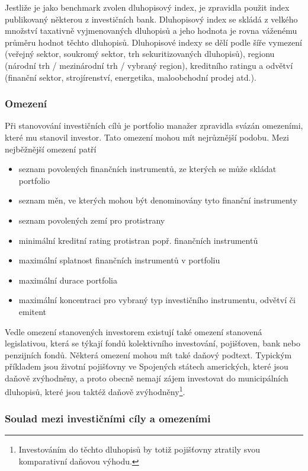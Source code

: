 \documentclass[a4paper]{book}
\begin{document}
Jestliže je jako benchmark zvolen dluhopisový index, je zpravidla použit index publikovaný některou z investičních bank. Dluhopisový index se skládá z velkého množství taxativně vyjmenovaných dluhopisů a jeho hodnota je rovna váženému průměru hodnot těchto dluhopisů. Dluhopisové indexy se dělí podle šíře vymezení (veřejný sektor, soukromý sektor, trh sekuritizovaných dluhopisů), regionu (národní trh / mezinárodní trh / vybraný region), kreditního ratingu a odvětví (finanční sektor, strojírenství, energetika, maloobchodní prodej atd.).

\subsubsection{Omezení}

Při stanovování investičních cílů je portfolio manažer zpravidla svázán omezeními, které mu stanovil investor. Tato omezení mohou mít nejrůznější podobu. Mezi nejběžnější omezení patří
\begin{itemize}
\item seznam povolených finančních instrumentů, ze kterých se může skládat portfolio
\item seznam měn, ve kterých mohou být denominovány tyto finanční instrumenty
\item seznam povolených zemí pro protistrany
\item minimální kreditní rating protistran popř. finančních instrumentů
\item maximální splatnost finančních instrumentů v portfoliu
\item maximální durace portfolia
\item maximální koncentraci pro vybraný typ investičního instrumentu, odvětví či emitent
\end{itemize}
Vedle omezení stanovených investorem existují také omezení stanovená legislativou, která se týkají fondů kolektivního investování, pojišťoven, bank nebo penzijních fondů. Některá omezení mohou mít také daňový podtext. Typickým příkladem jsou životní pojišťovny ve Spojených státech amerických, které jsou daňově zvýhodněny, a proto obecně nemají zájem investovat do municipálních dluhopisů, které jsou taktéž daňově zvýhodněny\footnote{Investováním do těchto dluhopisů by totiž pojišťovny ztratily svou komparativní daňovou výhodu.}.

\subsubsection{Soulad mezi investičními cíly a omezeními}
\end{document}
